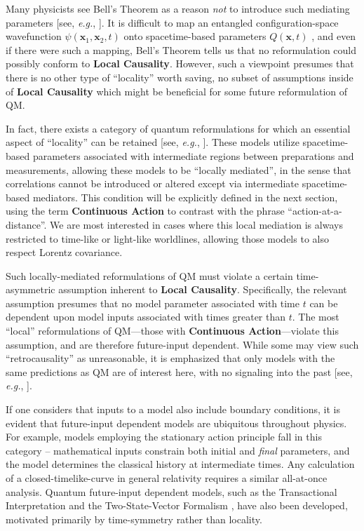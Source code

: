 \documentclass[onecolumn, nofootinbib, 12pt]{revtex4-1}
\begin{document}
Many physicists see Bell's Theorem as a reason {\em not} to introduce such mediating parameters [see, \emph{e.g.}, \textcite{mermin1986}].  It is difficult to map an entangled configuration-space wavefunction $\psi(\bm{x}_1,\bm{x}_2,t)$ onto spacetime-based parameters $Q(\bm{x},t)$ \cite{norsen2010,stoica2019}, and even if there were such a mapping,
Bell's Theorem tells us that no reformulation could possibly conform to {\bf Local Causality}.  However, such a viewpoint presumes that there is no other type of ``locality'' worth saving, no subset of assumptions inside of {\bf Local Causality} which might be beneficial for some future reformulation of QM.  

In fact, there exists a category of quantum reformulations for which an essential aspect of ``locality'' can be retained [see, \emph{e.g.}, \textcite{costa1953,price1997,argaman2010}].  These models utilize spacetime-based parameters associated with intermediate regions between preparations and measurements, allowing these models to be ``locally mediated'', in the sense that correlations cannot be introduced or altered except via intermediate spacetime-based mediators.  This condition will be explicitly defined in the next section, using the term {\bf Continuous Action} to contrast with the phrase ``action-at-a-distance''.  We are most interested in cases where this local mediation is always restricted to time-like or light-like worldlines, allowing those models to also respect Lorentz covariance.  

Such locally-mediated reformulations of QM must violate a certain time-asymmetric assumption inherent to {\bf Local Causality}.  Specifically, the relevant assumption presumes that no model parameter associated with time $t$ can be dependent upon model inputs associated with times greater than $t$.  The most ``local'' reformulations of QM---those with {\bf Continuous Action}---violate this assumption, and are therefore future-input dependent.  While some may view such ``retrocausality'' as unreasonable, it is emphasized that only models with the same predictions as QM are of interest here, with no signaling into the past [see, \emph{e.g.}, \textcite{price1997}].  

If one considers that inputs to a model also include boundary conditions, it is evident that future-input dependent models are ubiquitous throughout physics.  For example, models employing the stationary action principle fall in this category -- mathematical inputs constrain both initial and \emph{final} parameters, and the model determines the classical history at intermediate times.  Any calculation of a closed-timelike-curve in general relativity requires a similar all-at-once analysis.  Quantum future-input dependent models, such as the Transactional Interpretation \cite{cramer1980} and the Two-State-Vector Formalism \cite{aharonov1991}, have also been developed, motivated primarily by time-symmetry rather than locality.
\end{document}
